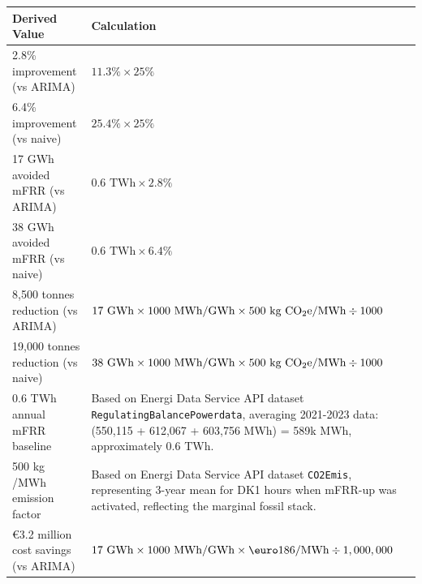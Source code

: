 \begin{xltabular}{\textwidth}{lX}
    \hline
    \textbf{Derived Value}              & \textbf{Calculation} \\ \hline
    \endfirsthead

    2.8\% improvement (vs ARIMA)                 & \(11.3\% \times 25\%\)                                                                                                                                                       \\
    6.4\% improvement (vs naive)                 & \(25.4\% \times 25\%\)                                                                                                                                                       \\
    17 GWh avoided mFRR (vs ARIMA)               & \(0.6 \text{ TWh} \times 2.8\%\)                                                                                                                                             \\
    38 GWh avoided mFRR (vs naive)               & \(0.6 \text{ TWh} \times 6.4\%\)                                                                                                                                             \\
    8,500 tonnes \cotwoe{} reduction (vs ARIMA)  & \(17 \text{ GWh} \times 1000 \text{ MWh/GWh} \times 500 \text{ kg CO$_{2}$e{}/MWh} \div 1000\)                                                                                 \\
    19,000 tonnes \cotwoe{} reduction (vs naive) & \(38 \text{ GWh} \times 1000 \text{ MWh/GWh} \times 500 \text{ kg CO$_{2}$e{}/MWh} \div 1000\)                                                                                 \\
    0.6 TWh annual mFRR baseline                 & Based on Energi Data Service API dataset \texttt{RegulatingBalancePowerdata}, averaging 2021-2023 data: (550,115 + 612,067 + 603,756 MWh) = 589k MWh, approximately 0.6 TWh. \\
    500 kg \cotwoe{}/MWh emission factor         & Based on Energi Data Service API dataset \texttt{CO2Emis}, representing 3-year mean for DK1 hours when mFRR-up was activated, reflecting the marginal fossil stack.          \\
    \euro3.2 million cost savings (vs ARIMA)         & \(17 \text{ GWh} \times 1000 \text{ MWh/GWh} \times \text{\euro}186/\text{MWh} \div 1,000,000\)                                                                                  \\

\end{xltabular}
